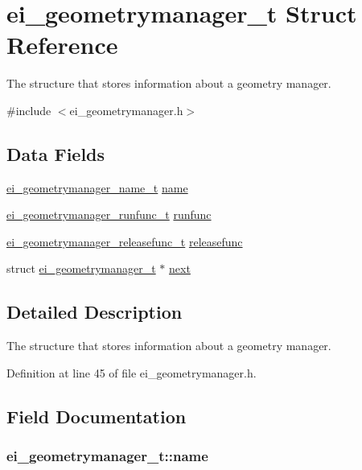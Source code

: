 \hypertarget{structei__geometrymanager__t}{\section{ei\+\_\+geometrymanager\+\_\+t Struct Reference}
\label{structei__geometrymanager__t}
}


The structure that stores information about a geometry manager.  




{\ttfamily \#include $<$ei\+\_\+geometrymanager.\+h$>$}

\subsection*{Data Fields}
\begin{DoxyCompactItemize}
\item 
\hyperlink{ei__geometrymanager_8h_af4774cf9094dc50890c3b767481d6336}{ei\+\_\+geometrymanager\+\_\+name\+\_\+t} \hyperlink{structei__geometrymanager__t_a35b158e8d1493f9dba541a85818d2824}{name}
\item 
\hyperlink{ei__geometrymanager_8h_a29270ac9786c3b30b385c473671311af}{ei\+\_\+geometrymanager\+\_\+runfunc\+\_\+t} \hyperlink{structei__geometrymanager__t_a49ab7a4f7b357bdd515a8e7affccdba0}{runfunc}
\item 
\hyperlink{ei__geometrymanager_8h_a66a8ffc0df10cdc7accb921fbed8a930}{ei\+\_\+geometrymanager\+\_\+releasefunc\+\_\+t} \hyperlink{structei__geometrymanager__t_adb7afc019219b29a9751b56da5a23b93}{releasefunc}
\item 
struct \hyperlink{structei__geometrymanager__t}{ei\+\_\+geometrymanager\+\_\+t} $\ast$ \hyperlink{structei__geometrymanager__t_a5ac5b387d05d2fd7dcb81bb1572a2200}{next}
\end{DoxyCompactItemize}


\subsection{Detailed Description}
The structure that stores information about a geometry manager. 

Definition at line 45 of file ei\+\_\+geometrymanager.\+h.



\subsection{Field Documentation}
\hypertarget{structei__geometrymanager__t_a35b158e8d1493f9dba541a85818d2824}{
\subsubsection[{name}]{ ei\+\_\+geometrymanager\+\_\+t\+::name}}\label{structei__geometrymanager__t_a35b158e8d1493f9dba541a85818d2824}


